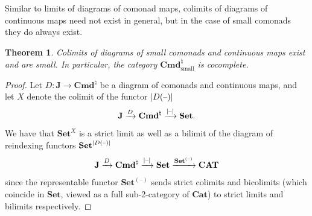 \documentclass[11pt, oneside, article]{memoir}
\theoremstyle{plain}
\newtheorem{theorem}{Theorem}[section]
\theoremstyle{definition}
\theoremstyle{remark}
\DeclarePairedDelimiter{\abs}{\lvert}{\rvert}
\newcommand{\dash}{{\mathord{\text{--}}}}
\newcommand{\xto}[1]{\xrightarrow{#1}}
\newcommand{\namedcat}[1]{\mathbf{#1}}
\newcommand{\cat}[1]{\mathbf{#1}}
\newcommand{\Set}{\namedcat{Set}}
\newcommand{\Cat}{\namedcat{Cat}}
\newcommand{\CAT}{\namedcat{CAT}}
\newcommand{\Con}{\namedcat{Cmd}^\natural}
\newcommand{\ConSet}{\Con}
\newcommand{\ConO}{\Con}
\newcommand{\ConOSet}{\ConO}
\newcommand{\CoalgOn}[2]{{#2}^{#1}}
\newcommand{\CoalgSet}[1]{\CoalgOn{#1}{\Set}}
\newcommand{\CoalgSetp}[1]{\CoalgOn{#1}{\Set}}
\newcommand{\clift}[1]{\overline{#1}}
\newcommand{\pts}[1]{{\abs{#1}}}
\newcommand{\one}[1]{\pts{#1}}
\newcommand{\carr}{\Sigma}
\newcommand{\reindex}[1]{\Delta_{#1}}
\newcommand{\car}[1]{\carr^{#1}}
\newcommand{\con}[2]{{#1}^{#2}}
\newcommand{\AccCon}{\Con_{\mathrm{small}}}
\newcommand{\AccConO}{\AccCon}
\newcommand{\AccConOSet}{\AccConO}
\newcommand{\cmnd}[1]{{#1}}
\newcommand{\xX}{X}
\newcommand{\cC}{\cmnd{C}}
\newcommand{\cD}{\cmnd{D}}
\newcommand{\bE}{\cat{E}}
\newcommand{\bJ}{\cat{J}}
\newcommand{\CSetp}{\CoalgSetp{\cC}}
\newcommand{\DSet}{\CoalgSet{\cD}}
\newcommand{\DSetp}{\CoalgSet{\cD}}
\newcommand{\SetD}{\Set/\pts{\cD}}
\newcommand{\SetpC}{\Set^\pts{\cC}}
\newcommand{\SetpD}{\Set^\pts{\cD}}
\begin{document}
Similar to limits of diagrams of comonad maps, colimits of diagrams of
continuous maps need not exist in general, but in the case of small
comonads they do always exist.

\begin{theorem}\label{prop:contcocomplete}
  Colimits of diagrams of small comonads and continuous maps exist and
  are small. In particular, the category $\AccConOSet$ is cocomplete.
\end{theorem}

\begin{proof}
  Let $D \colon \bJ \to \ConOSet$ be a diagram of comonads and
  continuous maps, and let $\xX$ denote the colimit of the functor
  $\pts{D(\dash)}$
  \[\bJ \xto{D} \ConOSet \xto{\pts{\dash}} \Set.\] We have that
  $\Set^{\xX}$ is a strict limit as well as a bilimit of the diagram of
  reindexing functors $\Set^{\pts{D(\dash)}}$
  \[\bJ \xto{D} \ConOSet \xto{\pts{\dash}} \Set
    \xto{\Set^{(\dash)}} \CAT\] since the representable functor
  $\Set^{(\dash)}$ sends strict colimits and bicolimits (which
  coincide in $\Set$, viewed as a full sub-2-category of $\Cat$) to
  strict limits and bilimits respectively.


\end{proof}
\end{document}
